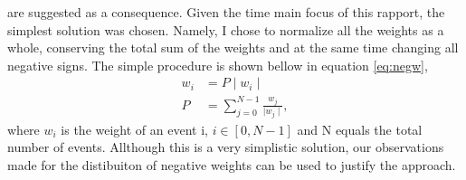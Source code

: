 are suggested as a consequence. Given the time main focus of this rapport, the 
simplest solution was chosen. Namely, I chose to normalize all the weights as a 
whole, conserving the total sum of the weights and at the same time changing all 
negative signs. The simple procedure is shown bellow in equation \ref{eq:negw},
\begin{align}\label{eq:negw}
    w_i & = P \mid w_i \mid\,  \\
    P  & =  \sum_{j=0}^{N-1}\frac{ w_j}{\mid w_j \mid},
\end{align}
where $w_i$ is the weight of an event i, $i \in [0,N-1]$ and N equals the total number of events.
Allthough this is a very simplistic solution, our observations made for the distibuiton
of negative weights can be used to justify the approach.


